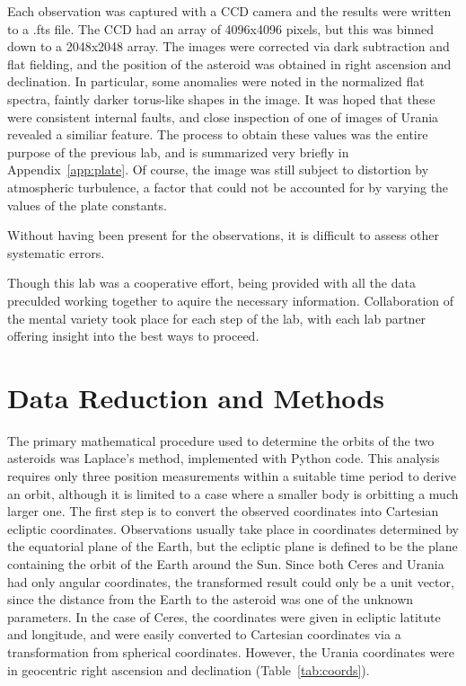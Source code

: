 \documentclass[a4paper,12pt]{article}
\begin{document}
Each observation was captured with a CCD camera and the results were written to a .fts file. The CCD had an array of 4096x4096 pixels, but this was binned down to a 2048x2048 array. The images were corrected via dark subtraction and flat fielding, and the position of the asteroid was obtained in right ascension and declination. In particular, some anomalies were noted in the normalized flat spectra, faintly darker torus-like shapes in the image. It was hoped that these were consistent internal faults, and close inspection of one of images of Urania revealed a similiar feature.  The process to obtain these values was the entire purpose of the previous lab, and is summarized very briefly in Appendix~\ref{app:plate}. Of course, the image was still subject to distortion by atmospheric turbulence, a factor that could not be accounted for by varying the values of the plate constants.

Without having been present for the observations, it is difficult to assess other systematic errors.

Though this lab was a cooperative effort, being provided with all the data preculded working together to aquire the necessary information. Collaboration of the mental variety took place for each step of the lab, with each lab partner offering insight into the best ways to proceed.



\section{Data Reduction and Methods}
\label{sec:data}

The primary mathematical procedure used to determine the orbits of the two asteroids was Laplace's method, implemented with Python code. This analysis requires only three position measurements within a suitable time period to derive an orbit, although it is limited to a case where a smaller body is orbitting a much larger one. The first step is to convert the observed coordinates into Cartesian ecliptic coordinates. Observations usually take place in coordinates determined by the equatorial plane of the Earth, but the ecliptic plane is defined to be the plane containing the orbit of the Earth around the Sun. Since both Ceres and Urania had only angular coordinates, the transformed result could only be a unit vector, since the distance from the Earth to the asteroid was one of the unknown parameters. In the case of Ceres, the coordinates were given in ecliptic latitute and longitude, and were easily converted to Cartesian coordinates via a transformation from spherical coordinates. However, the Urania coordinates were in geocentric right ascension and declination (Table~\ref{tab:coords}).
\end{document}
